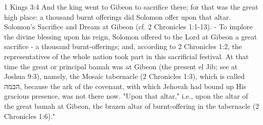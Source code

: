\documentclass[11pt]{article}
\begin{document}
1 Kings 3:4
And the king went to Gibeon to sacrifice there; for that was the great high place: a thousand burnt offerings did Solomon offer upon that altar.
Solomon's Sacrifice and Dream at Gibeon (cf. 2 Chronicles 1:1-13). - To implore the divine blessing upon his reign, Solomon offered to the Lord at Gibeon a great sacrifice - a thousand burnt-offerings; and, according to 2 Chronicles 1:2, the representatives of the whole nation took part in this sacrificial festival. At that time the great or principal bamah was at Gibeon (the present el Jib; see at Joshua 9:3), namely, the Mosaic tabernacle (2 Chronicles 1:3), which is called הבּמה, because the ark of the covenant, with which Jehovah had bound up His gracious presence, was not there now. "Upon that altar," i.e., upon the altar of the great bamah at Gibeon, the brazen altar of burnt-offering in the tabernacle (2 Chronicles 1:6)."
\end{document}
